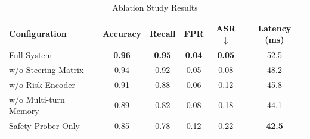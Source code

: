 
\begin{table}[h]
\centering
\caption{Ablation Study Results}
\label{tab:ablation}
\begin{tabular}{lccccc}
\toprule
\textbf{Configuration} & \textbf{Accuracy} & \textbf{Recall} & \textbf{FPR} & \textbf{ASR$\downarrow$} & \textbf{Latency (ms)} \\
\midrule
Full System & \textbf{0.96} & \textbf{0.95} & \textbf{0.04} & \textbf{0.05} & 52.5 \\
\midrule
w/o Steering Matrix & 0.94 & 0.92 & 0.05 & 0.08 & 48.2 \\
w/o Risk Encoder & 0.91 & 0.88 & 0.06 & 0.12 & 45.8 \\
w/o Multi-turn Memory & 0.89 & 0.82 & 0.08 & 0.18 & 44.1 \\
Safety Prober Only & 0.85 & 0.78 & 0.12 & 0.22 & \textbf{42.5} \\
\bottomrule
\end{tabular}
\end{table}
